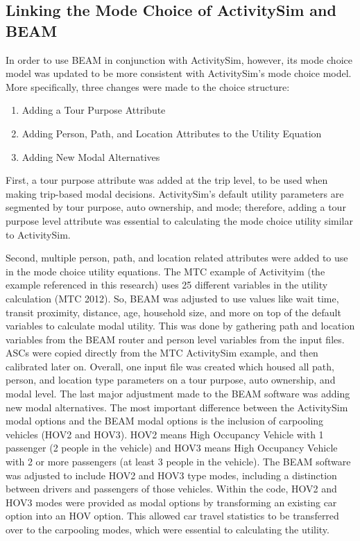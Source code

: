 \documentclass[12pt, oneside, openright]{byuthesis}
\providecommand{\tightlist}{%
  \setlength{\itemsep}{0pt}\setlength{\parskip}{0pt}}
\begin{document}
\hypertarget{meth-beam-link}{%
\subsection{Linking the Mode Choice of ActivitySim and BEAM}\label{meth-beam-link}}

In order to use BEAM in conjunction with ActivitySim, however, its mode choice model was updated to be more consistent with ActivitySim's mode choice model. More specifically, three changes were made to the choice structure:

\begin{enumerate}
\def\labelenumi{\arabic{enumi}.}
\tightlist
\item
  Adding a Tour Purpose Attribute
\item
  Adding Person, Path, and Location Attributes to the Utility Equation
\item
  Adding New Modal Alternatives
\end{enumerate}

First, a tour purpose attribute was added at the trip level, to be used when making trip-based modal decisions. ActivitySim's default utility parameters are segmented by tour purpose, auto ownership, and mode; therefore, adding a tour purpose level attribute was essential to calculating the mode choice utility similar to ActivitySim.

Second, multiple person, path, and location related attributes were added to use in the mode choice utility equations. The MTC example of Activityim (the example referenced in this research) uses 25 different variables in the utility calculation (MTC 2012). So, BEAM was adjusted to use values like wait time, transit proximity, distance, age, household size, and more on top of the default variables to calculate modal utility. This was done by gathering path and location variables from the BEAM router and person level variables from the input files. ASCs were copied directly from the MTC ActivitySim example, and then calibrated later on. Overall, one input file was created which housed all path, person, and location type parameters on a tour purpose, auto ownership, and modal level.
The last major adjustment made to the BEAM software was adding new modal alternatives. The most important difference between the ActivitySim modal options and the BEAM modal options is the inclusion of carpooling vehicles (HOV2 and HOV3). HOV2 means High Occupancy Vehicle with 1 passenger (2 people in the vehicle) and HOV3 means High Occupancy Vehicle with 2 or more passengers (at least 3 people in the vehicle). The BEAM software was adjusted to include HOV2 and HOV3 type modes, including a distinction between drivers and passengers of those vehicles. Within the code, HOV2 and HOV3 modes were provided as modal options by transforming an existing car option into an HOV option. This allowed car travel statistics to be transferred over to the carpooling modes, which were essential to calculating the utility.
\end{document}
